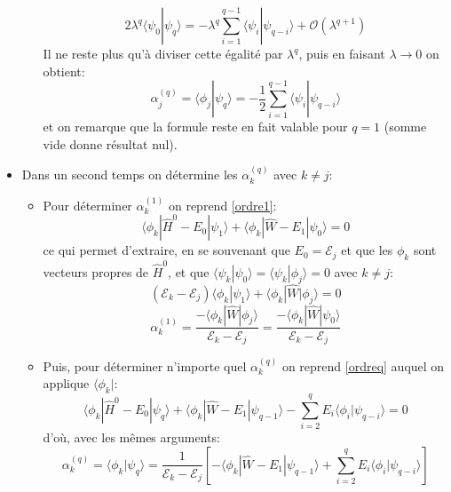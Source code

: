 \documentclass[svgnames,dvipsnames,a4paper,10pt,french]{report}
\begin{document}
\begin{itemize}
\begin{itemize}
    \begin{equation}
        2 \lambda^q \langle \psi_0 | \psi_q\rangle = - \lambda^q \sum_{i=1}^{q-1} \langle \psi_i |\psi_{q-i} \rangle + \mathcal{O}(\lambda^{q+1})
    \end{equation}
    Il ne reste plus qu'à diviser cette égalité par $\lambda^q$, puis en faisant $\lambda \rightarrow 0$ on obtient:
    \begin{equation}
    \label{phijpsiq}
        \boxed{\alpha^{(q)}_j = \langle \phi_j | \psi_q\rangle=-\frac{1}{2}\sum_{i=1}^{q-1} \langle \psi_i |\psi_{q-i} \rangle }
    \end{equation}
    et on remarque que la formule reste en fait valable pour $q=1$ (somme vide donne résultat nul).
\end{itemize}




 \item Dans un second temps on détermine les $\alpha_k^{(q)}$ avec $k \neq j$:
 \begin{itemize}
     \item Pour déterminer $\alpha_k^{(1)}$  on reprend \ref{ordre1}:
     \begin{equation}
        \langle \phi_k|\hat{H}^0 - E_0 |\psi_1\rangle + \langle \phi_k | \hat{W}-E_1|\psi_{0}\rangle = 0
     \end{equation}
     ce qui permet d'extraire,  en se souvenant que $E_0 = \mathcal{E}_j$ et que les $\phi_k$ sont vecteurs propres de $\hat{H}^0$, et que $\langle \psi_k | \psi_0\rangle = \langle \psi_k | \phi_j\rangle = 0$ avec $k\neq j$:
     \begin{equation}
         (\mathcal{E}_k-\mathcal{E}_j) \langle \phi_k | \psi_1 \rangle + \langle \phi_k | \hat{W} | \phi_j \rangle = 0
     \end{equation}
     \begin{equation}
         \boxed{\alpha^{(1)}_k = \frac{-\langle \phi_k | \hat{W} | \phi_j\rangle}{\mathcal{E}_k-\mathcal{E}_j} = \frac{-\langle \phi_k | \hat{W} | \psi_0\rangle}{\mathcal{E}_k-\mathcal{E}_j}}
     \end{equation}
     

  \item Puis, pour déterminer n'importe quel $\alpha_k^{(q)}$ on reprend \ref{ordreq} auquel on applique $\langle \phi_k|$:
\begin{equation}
    \langle \phi_k|\hat{H}^0 - E_0 |\psi_q\rangle + \langle \phi_k | \hat{W}-E_1|\psi_{q-1}\rangle - \sum_{i=2}^{q} E_i \langle \phi_i | \psi_{q-i}\rangle  = 0
\end{equation}
d'où, avec les mêmes arguments:
\begin{equation}
\label{alphaknjq}
\boxed{
    \alpha_k^{(q)} = \langle \phi_k | \psi_q\rangle = \frac{1}{\mathcal{E}_k-\mathcal{E}_j} \left[ - \langle \phi_k | \hat{W}-E_1|\psi_{q-1} \rangle + \sum_{i=2}^q E_i \langle \phi_i |\psi_{q-i} \rangle \right]}
\end{equation}
 \end{itemize}
\end{itemize}
\end{document}
